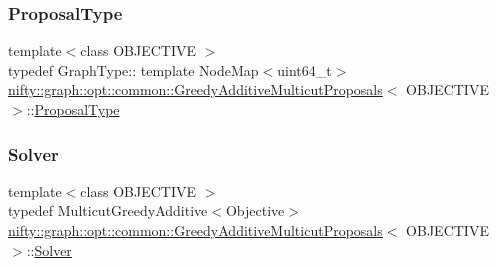 \mbox{\label{classnifty_1_1graph_1_1opt_1_1common_1_1GreedyAdditiveMulticutProposals_a1a51f12b52812e4a7942bcfaa2d35d05}} 
\subsubsection{\texorpdfstring{Proposal\+Type}{ProposalType}}
{\footnotesize\ttfamily template$<$class O\+B\+J\+E\+C\+T\+I\+VE $>$ \\
typedef Graph\+Type\+:: template Node\+Map$<$uint64\+\_\+t$>$ \hyperlink{classnifty_1_1graph_1_1opt_1_1common_1_1GreedyAdditiveMulticutProposals}{nifty\+::graph\+::opt\+::common\+::\+Greedy\+Additive\+Multicut\+Proposals}$<$ O\+B\+J\+E\+C\+T\+I\+VE $>$\+::\hyperlink{classnifty_1_1graph_1_1opt_1_1common_1_1GreedyAdditiveMulticutProposals_a1a51f12b52812e4a7942bcfaa2d35d05}{Proposal\+Type}}

\mbox{\label{classnifty_1_1graph_1_1opt_1_1common_1_1GreedyAdditiveMulticutProposals_ad034fe9ab2c958d276ff06aeb2c39122}} 
\subsubsection{\texorpdfstring{Solver}{Solver}}
{\footnotesize\ttfamily template$<$class O\+B\+J\+E\+C\+T\+I\+VE $>$ \\
typedef Multicut\+Greedy\+Additive$<$Objective$>$ \hyperlink{classnifty_1_1graph_1_1opt_1_1common_1_1GreedyAdditiveMulticutProposals}{nifty\+::graph\+::opt\+::common\+::\+Greedy\+Additive\+Multicut\+Proposals}$<$ O\+B\+J\+E\+C\+T\+I\+VE $>$\+::\hyperlink{classnifty_1_1graph_1_1opt_1_1common_1_1GreedyAdditiveMulticutProposals_ad034fe9ab2c958d276ff06aeb2c39122}{Solver}}

